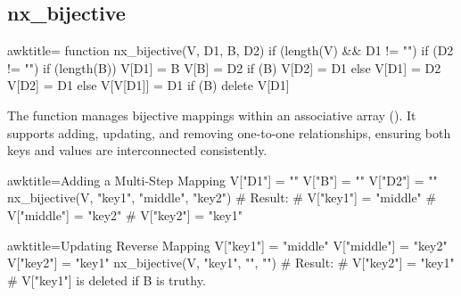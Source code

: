 \newpage
\subsection{nx_bijective}
\label{nx_bijective}
\begin{NexCodeBox}{awk}{title={}}
function nx_bijective(V, D1, B, D2) {
	if (length(V) && D1 != "") {
		if (D2 != "") {
			if (length(B)) {
				V[D1] = B
				V[B] = D2
				if (B)
					V[D2] = D1
			} else {
				V[D1] = D2
				V[D2] = D1
			}
		} else {
			V[V[D1]] = D1
			if (B)
				delete V[D1]
		}
	}
}
\end{NexCodeBox}

\begin{NexMainBox}
	\begin{NexMainBox}
		The  function manages bijective mappings within an associative array (). It supports adding, updating, and removing one-to-one relationships, ensuring both keys and values are interconnected consistently.
	\end{NexMainBox}
	\begin{NexMainBox}
		\begin{NexListDark}
		\end{NexListDark}
	\end{NexMainBox}
\end{NexMainBox}

\begin{NexCodeBox}{awk}{title={Adding a Multi-Step Mapping}}
	V["D1"] = ""
	V["B"] = ""
	V["D2"] = ""
	nx_bijective(V, "key1", "middle", "key2")
	# Result:
	# V["key1"] = "middle"
	# V["middle"] = "key2"
	# V["key2"] = "key1"
\end{NexCodeBox}

\begin{NexCodeBox}{awk}{title={Updating Reverse Mapping}}
	V["key1"] = "middle"
	V["middle"] = "key2"
	V["key2"] = "key1"
	nx_bijective(V, "key1", "", "")
	# Result:
	# V["key2"] = "key1"
	# V["key1"] is deleted if B is truthy.
\end{NexCodeBox}

